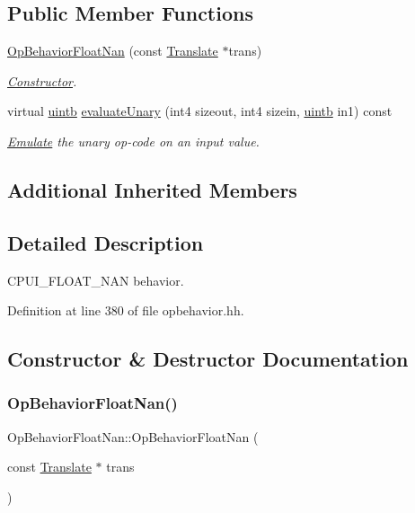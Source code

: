 \subsection*{Public Member Functions}
\begin{DoxyCompactItemize}
\item 
\mbox{\hyperlink{class_op_behavior_float_nan_a374e82fdb236485af3d5e0f8e13c8cbe}{Op\+Behavior\+Float\+Nan}} (const \mbox{\hyperlink{class_translate}{Translate}} $\ast$trans)
\begin{DoxyCompactList}\small\item\em \mbox{\hyperlink{class_constructor}{Constructor}}. \end{DoxyCompactList}\item 
virtual \mbox{\hyperlink{types_8h_a2db313c5d32a12b01d26ac9b3bca178f}{uintb}} \mbox{\hyperlink{class_op_behavior_float_nan_a7863907c32548fd08e6207c9ea945057}{evaluate\+Unary}} (int4 sizeout, int4 sizein, \mbox{\hyperlink{types_8h_a2db313c5d32a12b01d26ac9b3bca178f}{uintb}} in1) const
\begin{DoxyCompactList}\small\item\em \mbox{\hyperlink{class_emulate}{Emulate}} the unary op-\/code on an input value. \end{DoxyCompactList}\end{DoxyCompactItemize}
\subsection*{Additional Inherited Members}


\subsection{Detailed Description}
C\+P\+U\+I\+\_\+\+F\+L\+O\+A\+T\+\_\+\+N\+AN behavior. 

Definition at line 380 of file opbehavior.\+hh.



\subsection{Constructor \& Destructor Documentation}
\mbox{\label{class_op_behavior_float_nan_a374e82fdb236485af3d5e0f8e13c8cbe}} 
\subsubsection{\texorpdfstring{OpBehaviorFloatNan()}{OpBehaviorFloatNan()}}
{\footnotesize\ttfamily Op\+Behavior\+Float\+Nan\+::\+Op\+Behavior\+Float\+Nan (\begin{DoxyParamCaption}\item[{const \mbox{\hyperlink{class_translate}{Translate}} $\ast$}]{trans }\end{DoxyParamCaption})\hspace{0.3cm}{\ttfamily [inline]}}



